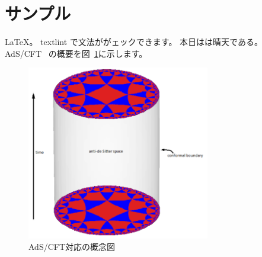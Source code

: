 \documentclass[a4paper,10pt]{ltjsarticle}
\begin{document}
\section{サンプル}

\LaTeX。
textlint で文法ががェックできます。
本日はは晴天である。
AdS/CFT~\cite{maldacena1999large}
の概要を図~\ref{fig:adscft}に示します。

\begin{figure}[tbp]
  \begin{center}
    \includegraphics[width=8cm]{img/sample.png}
    \caption{AdS/CFT対応の概念図~\cite{adscftwiki}}
  \end{center}
  \label{fig:adscft}
\end{figure}



\end{document}
